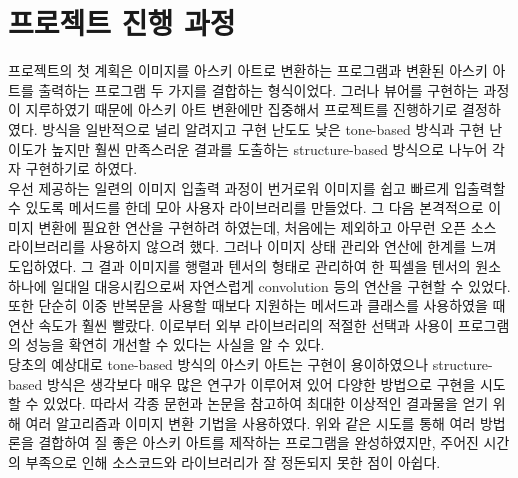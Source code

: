 \documentclass[conference]{IEEEtran}
\begin{document}
\section{프로젝트 진행 과정}

프로젝트의 첫 계획은 이미지를 아스키 아트로 변환하는 프로그램과 변환된 아스키 아트를 출력하는 프로그램 두 가지를 결합하는 형식이었다.
그러나  뷰어를 구현하는 과정이 지루하였기 때문에 아스키 아트 변환에만 집중해서 프로젝트를 진행하기로 결정하였다.
방식을 일반적으로 널리 알려지고 구현 난도도 낮은 tone-based 방식과 구현 난이도가 높지만 훨씬 만족스러운 결과를 도출하는 structure-based 방식으로 나누어 각자 구현하기로 하였다. \\
\indent 우선  제공하는 일련의 이미지 입출력 과정이 번거로워 이미지를 쉽고 빠르게 입출력할 수 있도록  메서드를 한데 모아 사용자 라이브러리를 만들었다.
그 다음 본격적으로 이미지 변환에 필요한 연산을 구현하려 하였는데, 처음에는  제외하고 아무런 오픈 소스 라이브러리를 사용하지 않으려 했다.
그러나  이미지 상태 관리와 연산에 한계를 느껴  도입하였다.
그 결과 이미지를 행렬과 텐서의 형태로 관리하여 한 픽셀을 텐서의 원소 하나에 일대일 대응시킴으로써 자연스럽게 convolution 등의 연산을 구현할 수 있었다.
또한 단순히 이중 반복문을 사용할 때보다  지원하는 메서드과 클래스를 사용하였을 때 연산 속도가 훨씬 빨랐다.
이로부터 외부 라이브러리의 적절한 선택과 사용이 프로그램의 성능을 확연히 개선할 수 있다는 사실을 알 수 있다. \\
\indent 당초의 예상대로 tone-based 방식의 아스키 아트는 구현이 용이하였으나 structure-based 방식은 생각보다 매우 많은 연구가 이루어져 있어 다양한 방법으로 구현을 시도할 수 있었다.
따라서 각종 문헌과 논문을 참고하여 최대한 이상적인 결과물을 얻기 위해 여러 알고리즘과 이미지 변환 기법을 사용하였다.
위와 같은 시도를 통해 여러 방법론을 결합하여 질 좋은 아스키 아트를 제작하는 프로그램을 완성하였지만, 주어진 시간의 부족으로 인해 소스코드와 라이브러리가 잘 정돈되지 못한 점이 아쉽다.
\end{document}
